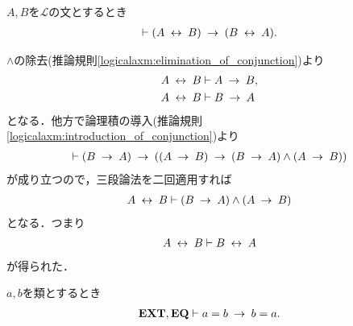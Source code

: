 	\begin{screen}
		\begin{logicalthm}[同値関係の対称律]
		\label{logicalthm:symmetry_of_equivalence_arrows}
			$A,B$を$\mathcal{L}$の文とするとき
			\begin{align}
				\vdash (A \lrarrow B) \rarrow (B \lrarrow A).
			\end{align}
		\end{logicalthm}
	\end{screen}
	
	\begin{prf}
		$\wedge$の除去(推論規則\ref{logicalaxm:elimination_of_conjunction})より
		\begin{align}
			A \lrarrow B &\vdash A \rarrow B, \\
			A \lrarrow B &\vdash B \rarrow A
		\end{align}
		となる．他方で論理積の導入(推論規則\ref{logicalaxm:introduction_of_conjunction})より
		\begin{align}
			\vdash (B \rarrow A) \rarrow ((A \rarrow B) \rarrow 
			(B \rarrow A) \wedge (A \rarrow B))
		\end{align}
		が成り立つので，三段論法を二回適用すれば
		\begin{align}
			A \lrarrow B \vdash (B \rarrow A) \wedge (A \rarrow B)
		\end{align}
		となる．つまり
		\begin{align}
			A \lrarrow B \vdash B \lrarrow A
		\end{align}
		が得られた．
		\QED
	\end{prf}
	
	\begin{screen}
		\begin{thm}[等号の対称律]
		\label{thm:symmetry_of_equality}
			$a,b$を類とするとき
			\begin{align}
				\EXTAX,\EQAX \vdash a = b \rarrow b = a.
			\end{align}
		\end{thm}
	\end{screen}
	

